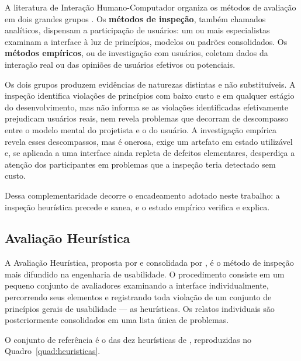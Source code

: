 A literatura de Interação Humano-Computador organiza os métodos de avaliação em
dois grandes grupos \cite{barbosasilva2010}. Os \textbf{métodos de inspeção},
também chamados analíticos, dispensam a participação de usuários: um ou mais
especialistas examinam a interface à luz de princípios, modelos ou padrões
consolidados. Os \textbf{métodos empíricos}, ou de investigação com usuários,
coletam dados da interação real ou das opiniões de usuários efetivos ou
potenciais.

Os dois grupos produzem evidências de naturezas distintas e não substituíveis. A
inspeção identifica violações de princípios com baixo custo e em qualquer estágio
do desenvolvimento, mas não informa se as violações identificadas efetivamente
prejudicam usuários reais, nem revela problemas que decorram de descompasso entre
o modelo mental do projetista e o do usuário. A investigação empírica revela
esses descompassos, mas é onerosa, exige um artefato em estado utilizável e, se
aplicada a uma interface ainda repleta de defeitos elementares, desperdiça a
atenção dos participantes em problemas que a inspeção teria detectado sem custo.

Dessa complementaridade decorre o encadeamento adotado neste trabalho: a
inspeção heurística precede e sanea, e o estudo empírico verifica e explica.

\subsection{Avaliação Heurística}
\label{sec:heuristica}

A Avaliação Heurística, proposta por  e consolidada
por , é o método de inspeção mais difundido na
engenharia de usabilidade. O procedimento consiste em um pequeno conjunto de
avaliadores examinando a interface individualmente, percorrendo seus elementos e
registrando toda violação de um conjunto de princípios gerais de usabilidade ---
as heurísticas. Os relatos individuais são posteriormente consolidados em uma
lista única de problemas.

O conjunto de referência é o das dez heurísticas de
, reproduzidas no Quadro~\ref{quad:heuristicas}.

